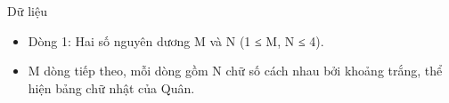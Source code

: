 Dữ liệu
\begin{itemize}
	\item Dòng 1: Hai số nguyên dương M và N (1 ≤ M, N ≤ 4).
	\item M dòng tiếp theo, mỗi dòng gồm N chữ số cách nhau bởi khoảng trắng, thể hiện bảng chữ nhật của Quân.
\end{itemize}
